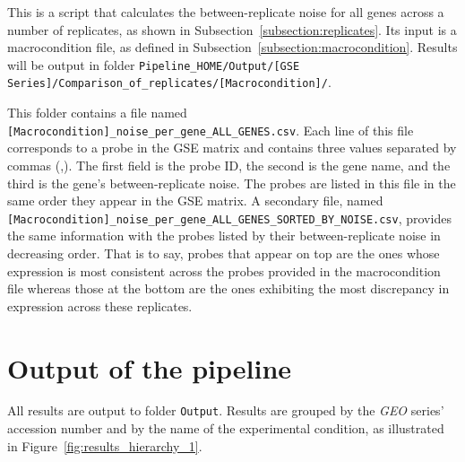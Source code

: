 \documentclass[final,letterpaper,12pt]{article}
\begin{document}
\par This is a script that calculates the between-replicate noise for all genes across a number of replicates, as shown in Subsection~\ref{subsection:replicates}. Its input is a macrocondition file, as defined in Subsection~\ref{subsection:macrocondition}. Results will be output in folder \texttt{Pipeline\_HOME/Output/[GSE Series]/Comparison\_of\_replicates/[Macrocondition]/}.

\par This folder contains a file named \texttt{[Macrocondition]\_noise\_per\_gene\_ALL\_GENES.csv}. Each line of this file corresponds to a probe in the GSE matrix and contains three values separated by commas (,). The first field is the probe ID, the second is the gene name, and the third is the gene's between-replicate noise. The probes are listed in this file in the same order they appear in the GSE matrix. A secondary file, named \texttt{[Macrocondition]\_noise\_per\_gene\_ALL\_GENES\_SORTED\_BY\_NOISE.csv}, provides the same information with the probes listed by their between-replicate noise in decreasing order. That is to say, probes that appear on top are the ones whose expression is most consistent across the probes provided in the macrocondition file whereas those at the bottom are the ones exhibiting the most discrepancy in expression across these replicates.


\section{Output of the pipeline}
\label{section:pipeline_output}

\par All results are output to folder \texttt{Output}. Results are grouped by the \textit{GEO} series' accession number and by the name of the experimental condition, as illustrated in Figure~\ref{fig:results_hierarchy_1}.
\end{document}
